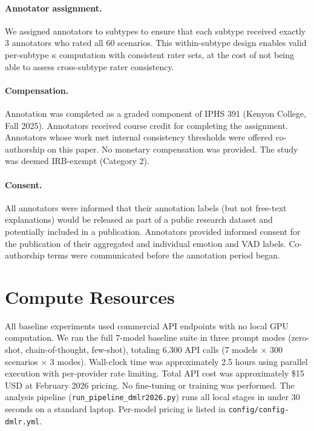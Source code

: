 \documentclass[twoside,11pt]{article}
\begin{document}
\paragraph{Annotator assignment.} We assigned annotators to subtypes to ensure that each subtype received exactly 3 annotators who rated all 60 scenarios. This within-subtype design enables valid per-subtype $\kappa$ computation with consistent rater sets, at the cost of not being able to assess cross-subtype rater consistency.

\paragraph{Compensation.} Annotation was completed as a graded component of IPHS 391 (Kenyon College, Fall 2025). Annotators received course credit for completing the assignment. Annotators whose work met internal consistency thresholds were offered co-authorship on this paper. No monetary compensation was provided. The study was deemed IRB-exempt (Category 2).

\paragraph{Consent.} All annotators were informed that their annotation labels (but not free-text explanations) would be released as part of a public research dataset and potentially included in a publication. Annotators provided informed consent for the publication of their aggregated and individual emotion and VAD labels. Co-authorship terms were communicated before the annotation period began.

\section{Compute Resources}
\label{app:compute}

All baseline experiments used commercial API endpoints with no local GPU computation. We ran the full 7-model baseline suite in three prompt modes (zero-shot, chain-of-thought, few-shot), totaling 6,300 API calls (7 models $\times$ 300 scenarios $\times$ 3 modes). Wall-clock time was approximately 2.5 hours using parallel execution with per-provider rate limiting. Total API cost was approximately \$15 USD at February 2026 pricing. No fine-tuning or training was performed. The analysis pipeline (\texttt{run\_pipeline\_dmlr2026.py}) runs all local stages in under 30 seconds on a standard laptop. Per-model pricing is listed in \texttt{config/config-dmlr.yml}.
\end{document}

